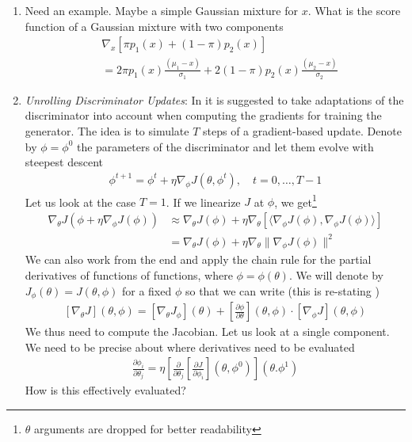 \documentclass{article}
\begin{document}
\begin{enumerate}
\item Need an example. Maybe a simple Gaussian mixture for $x$.
What is the score function of a Gaussian mixture with two components
\begin{align}
& \nabla_x [ \pi p_1(x) + (1-\pi) p_2(x)] \\
& = 2\pi p_1(x) \frac{(\mu_1-x)}{\sigma_1} + 2(1-\pi) p_2(x) \frac{(\mu_2-x)}{\sigma_2}
\end{align}
\newpage

\item \textit{Unrolling Discriminator Updates}: In \cite{metz2016unrolled} it is suggested to take adaptations of the discriminator into account when computing the gradients for training the generator.  The idea is to simulate $T$ steps of a gradient-based update. Denote by $\phi = \phi^0$ the parameters of the discriminator and let them evolve with steepest descent 
\begin{align}
\phi^{t+1} = \phi^t+ \eta \nabla_\phi J (\theta,\phi^t),  \quad t=0,\dots,T-1
\end{align}
Let us look at the case $T=1$. If we linearize $J$ at $\phi$, we get\footnote{$\theta$ arguments are dropped for better readability} 
\begin{align}
\nabla_\theta J(\phi + \eta \nabla_\phi J(\phi)) 
& \approx \nabla_\theta J(\phi) + \eta \nabla_\theta\left[ 
\langle \nabla_\phi J(\phi), \nabla_\phi J(\phi) \rangle
\right] \\
& = \nabla_\theta J(\phi) + \eta  \nabla_\theta \| \nabla_\phi J(\phi)\|^2
\end{align}
We can also work from the end and apply the chain rule for the partial derivatives of functions of functions, where $\phi = \phi(\theta)$. We will denote by $J_\phi(\theta) = J(\theta,\phi)$ for a fixed $\phi$ so that we can write (this is re-stating \cite[Eq.~(12)]{metz2016unrolled})
\begin{align}
\left[ \nabla_\theta J \right](\theta,\phi)  = 
\left[ \nabla_\theta J_{\phi} \right](\theta) + \left[\frac{\partial \phi}{\partial \theta}\right]\!(\theta,\phi) \cdot \left[ \nabla_\phi J \right] (\theta,\phi)
\end{align} 
We thus need to compute the Jacobian. Let us look at a single component. We need to be precise about where derivatives need to be evaluated 
\begin{align}
\frac{\partial \phi_i}{\partial \theta_j} = \eta \left[ \frac{\partial}{\partial \theta_j} \left[ \frac{\partial J}{\partial \phi_i} \right](\theta,\phi^0)  \right](\theta.\phi^1)
\end{align}
How is this effectively evaluated? 


\end{enumerate}
\end{document}
